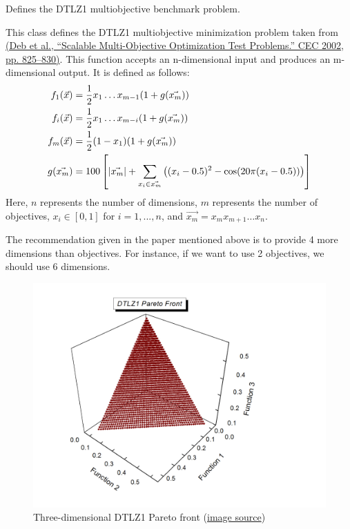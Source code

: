 \documentclass[letterpaper,10pt,english]{sphinxmanual}
\begin{document}

\begin{fulllineitems}
\label{reference:inspyred.benchmarks.DTLZ1}
Defines the DTLZ1 multiobjective benchmark problem.

This class defines the DTLZ1 multiobjective minimization problem
taken from \href{http://www.tik.ee.ethz.ch/sop/download/supplementary/testproblems/dtlz1/index.php}{(Deb et al., ``Scalable Multi-Objective Optimization Test Problems.''
CEC 2002, pp. 825--830)}.
This function accepts an n-dimensional input and produces an m-dimensional output.
It is defined as follows:
\begin{gather}
\begin{split}f_1(\vec{x}) &= \frac{1}{2} x_1 \dots x_{m-1}(1 + g(\vec{x_m})) \\
f_i(\vec{x}) &= \frac{1}{2} x_1 \dots x_{m-i}(1 + g(\vec{x_m})) \\
f_m(\vec{x}) &= \frac{1}{2} (1 - x_1)(1 + g(\vec{x_m})) \\
g(\vec{x_m}) &= 100\left[|\vec{x_m}| + \sum_{x_i \in \vec{x_m}}\left((x_i - 0.5)^2 - \cos(20\pi(x_i - 0.5))\right)\right] \\\end{split}\notag
\end{gather}
Here, $n$ represents the number of dimensions, $m$ represents the
number of objectives, $x_i \in [0, 1]$ for $i=1,...,n$, and 
$\vec{x_m} = x_m x_{m+1} \dots x_{n}.$

The recommendation given in the paper mentioned above is to provide 4 more
dimensions than objectives. For instance, if we want to use 2 objectives, we
should use 6 dimensions.
\begin{figure}[htbp]
\centering
\capstart

\includegraphics{dtlz1funb.jpg}
\caption{Three-dimensional DTLZ1 Pareto front 
(\href{http://delta.cs.cinvestav.mx/~ccoello/EMOO/testfuncs/}{image source})}\end{figure}


\end{fulllineitems}
\end{document}
